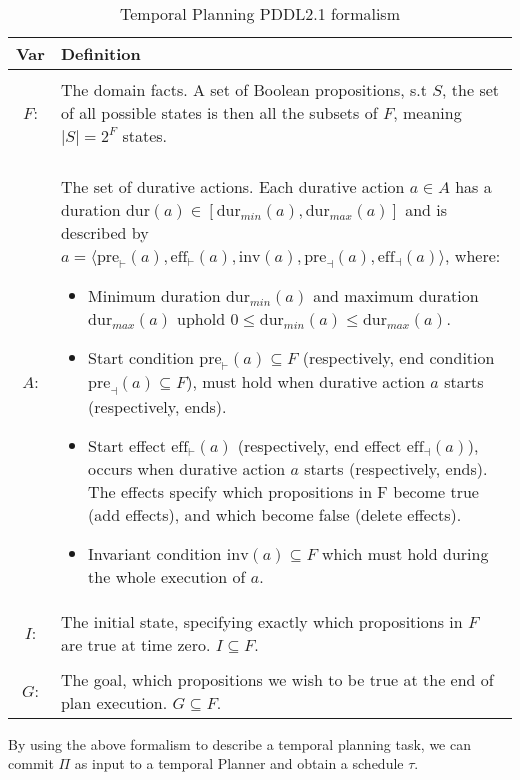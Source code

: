 \begin{table}[ht!]
\centering
\begin{tabularx}{\textwidth}{ c  X }

\textbf{Var}  & \textbf{Definition} \\
\hline
\\
$F$:     &  {The domain facts. A set of Boolean propositions, s.t $S$, the set of all possible states is then all the subsets of $F$, meaning $\mid S \mid = 2^F$ states.}  \\
\\
    $A$:     & {The set of durative actions. Each durative action $a \in A$ has a duration $\text{dur}(a) \in [\text{dur}_{min}(a), \text{dur}_{max}(a)]$ and is described by $a=\langle \text{pre}_{\vdash}(a), \text{eff}_{\vdash}(a),\text{inv}(a),\text{pre}_{\dashv}(a), \text{eff}_{\dashv}(a)\rangle$, where:
    \begin{itemize}
        \item Minimum duration $\text{dur}_{min}(a)$ and maximum duration $\text{dur}_{max}(a)$ uphold $0 \leq \text{dur}_{min}(a) \leq \text{dur}_{max}(a)$.
        \item Start condition $\text{pre}_{\vdash}(a) \subseteq F$ (respectively, end condition $\text{pre}_{\dashv}(a)  \subseteq F$), must hold when durative action $a$ starts (respectively, ends).
        \item Start effect $\text{eff}_{\vdash}(a)$ (respectively, end effect $\text{eff}_{\dashv}(a)$), occurs when durative action $a$ starts (respectively, ends). The effects specify which propositions in F become true (add effects), and which become false (delete effects).
        \item Invariant condition $\text{inv}(a) \subseteq F$ which must hold during the whole execution of $a$.
    \end{itemize}
    }      
    \\
$I$:     & {The initial state, specifying exactly which propositions in $F$ are true at time zero. $I\subseteq F$.}      \\
\\
$G$:     & {The goal, which propositions we wish to be true at the end of plan execution. $G \subseteq F$. }   \\

\end{tabularx}
\caption{Temporal Planning PDDL2.1 formalism}
\label{tab:strips}
\end{table}

By using the above formalism to describe a temporal planning task, we can commit
$\Pi$ as input to a temporal Planner and obtain a schedule $\tau$.\\